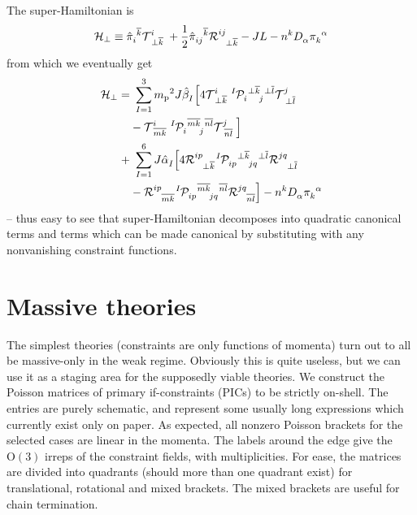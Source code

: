 \documentclass[aps,prd,reprint,preprintnumbers,superscriptaddress,showpacs,floatfix]{revtex4-2}
\begin{document}
The super-Hamiltonian is
\begin{equation}
  \mathcal{  H}_{\perp}\equiv\tensor{\hat{\pi}}{_i^{\overline{k}}}\tensor{\mathcal{  T}}{^i_{\perp\overline{k}}}+\frac{1}{2}\tensor{\hat{\pi}}{_{ij}^{\overline{k}}}\tensor{\mathcal{  R}}{^{ij}_{\perp\overline{k}}}-JL-\tensor{n}{^k}\tensor{D}{_\alpha}\tensor{\pi}{_k^\alpha}
  \label{<+label+>}
\end{equation}
from which we eventually get
\begin{equation}
\begin{aligned}
  \mathcal{  H}_{\perp}=&\ \sum_{I=1}^{3}{m_\text{p}}^2J\tensor{\hat{\beta}}{_{I}}\Big[4\tensor{\mathcal{  T}}{^i_{\perp\overline{k}}}\tensor[^I]{\mathcal{  P}}{_i^{\perp\overline{k}}_j^{\perp\overline{l}}}\tensor{\mathcal{  T}}{^j_{\perp\overline{l}}}\\
  &-\tensor{\mathcal{  T}}{^i_{\overline{mk}}}\tensor[^I]{\mathcal{  P}}{_i^{\overline{mk}}_j^{\overline{nl}}}\tensor{\mathcal{  T}}{^j_{\overline{nl}}}\Big]\\
  +&\ \sum_{I=1}^{6}J\tensor{\hat{\alpha}}{_{I}}\Big[4\tensor{\mathcal{  R}}{^{ip}_{\perp\overline{k}}}\tensor[^I]{\mathcal{  P}}{_{ip}^{\perp\overline{k}}_{jq}^{\perp\overline{l}}}\tensor{\mathcal{  R}}{^{jq}_{\perp\overline{l}}}\\
  &-\tensor{\mathcal{  R}}{^{ip}_{\overline{mk}}}\tensor[^I]{\mathcal{  P}}{_{ip}^{\overline{mk}}_{jq}^{\overline{nl}}}\tensor{\mathcal{  R}}{^{jq}_{\overline{nl}}}\Big]-\tensor{n}{^k}\tensor{D}{_\alpha}\tensor{\pi}{_k^\alpha}\\
  \label{<+label+>}
\end{aligned}
\end{equation}
-- thus easy to see that super-Hamiltonian decomposes into quadratic canonical terms and terms which can be made canonical by substituting with any nonvanishing constraint functions.











\section{Massive theories}

The simplest theories (constraints are only functions of momenta) turn out to all be massive-only in the weak regime. Obviously this is quite useless, but we can use it as a staging area for the supposedly viable theories. We construct the Poisson matrices of primary if-constraints (PICs) to be strictly on-shell. The entries are purely schematic, and represent some usually long expressions which currently exist only on paper. As expected, all nonzero Poisson brackets for the selected cases are linear in the momenta. The labels around the edge give the $\mathrm{O}(3)$ irreps of the constraint fields, with multiplicities. For ease, the matrices are divided into quadrants (should more than one quadrant exist) for translational, rotational and mixed brackets. The mixed brackets are useful for chain termination.
\end{document}
